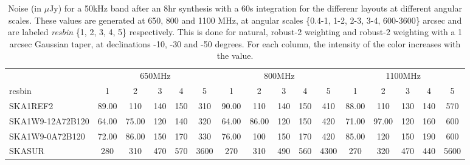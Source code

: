 \begin{table}[!htp]
{{\begin{tabular}{|lccccc||ccccc||ccccc|}
 \tabularnewline \cline{2-16} \multicolumn{1}{c}{ } & \multicolumn{5}{|c}{650MHz}  & \multicolumn{5}{c}{800MHz}  & \multicolumn{5}{c|}{1100MHz} \tabularnewline \cline{1-16} 
 resbin  &1 & 2 & 3 & 4 & 5 & 1 & 2 & 3 & 4 & 5 & 1 & 2 & 3 & 4 & 5 \tabularnewline \hline
SKA1REF2 & 89.00 \cellcolor{blue!22.86} & 110 \cellcolor{red!24.26} & 140 \cellcolor{green!20.40} & 150 \cellcolor{orange!18.98} & 310 \cellcolor{purple!18.00} & 90.00 \cellcolor{blue!23.30} & 110 \cellcolor{red!22.50} & 140 \cellcolor{green!20.27} & 150 \cellcolor{orange!18.00} & 410 \cellcolor{purple!18.00} & 88.00 \cellcolor{blue!21.59} & 110 \cellcolor{red!20.45} & 130 \cellcolor{green!19.20} & 140 \cellcolor{orange!18.00} & 570 \cellcolor{purple!18.00}\\ \hline 
SKA1W9-12A72B120 & 64.00 \cellcolor{blue!18.00} & 75.00 \cellcolor{red!18.00} & 120 \cellcolor{green!18.00} & 140 \cellcolor{orange!18.00} & 320 \cellcolor{purple!18.13} & 64.00 \cellcolor{blue!18.00} & 86.00 \cellcolor{red!18.00} & 120 \cellcolor{green!18.00} & 150 \cellcolor{orange!18.00} & 420 \cellcolor{purple!18.11} & 71.00 \cellcolor{blue!18.00} & 97.00 \cellcolor{red!18.00} & 120 \cellcolor{green!18.00} & 160 \cellcolor{orange!20.80} & 600 \cellcolor{purple!18.25}\\ \hline 
SKA1W9-0A72B120 & 72.00 \cellcolor{blue!19.56} & 86.00 \cellcolor{red!19.97} & 150 \cellcolor{green!21.60} & 170 \cellcolor{orange!20.93} & 330 \cellcolor{purple!18.26} & 76.00 \cellcolor{blue!20.45} & 100 \cellcolor{red!20.62} & 150 \cellcolor{green!21.41} & 170 \cellcolor{orange!20.05} & 420 \cellcolor{purple!18.11} & 85.00 \cellcolor{blue!20.95} & 120 \cellcolor{red!22.33} & 150 \cellcolor{green!21.60} & 190 \cellcolor{orange!25.00} & 600 \cellcolor{purple!18.25}\\ \hline 
SKASUR & 280 \cellcolor{blue!60.00} & 310 \cellcolor{red!60.00} & 470 \cellcolor{green!60.00} & 570 \cellcolor{orange!60.00} & 3600 \cellcolor{purple!60.00} & 270 \cellcolor{blue!60.00} & 310 \cellcolor{red!60.00} & 490 \cellcolor{green!60.00} & 560 \cellcolor{orange!60.00} & 4300 \cellcolor{purple!60.00} & 270 \cellcolor{blue!60.00} & 320 \cellcolor{red!60.00} & 470 \cellcolor{green!60.00} & 440 \cellcolor{orange!60.00} & 5600 \cellcolor{purple!60.00}\tabularnewline \hline 
\end{tabular}}\hfil 

\caption{Noise (in $\mu$Jy) for a 50kHz band after an 8hr synthesis with a 60s integration for the differenr layouts at different angular scales. These values are generated at 650, 800 and 1100 MHz, at angular scales \{0.4-1, 1-2, 2-3, 3-4, 600-3600\} arcsec and are labeled {\it resbin} \{1, 2, 3, 4, 5\} respectively. This is done for natural, robust-2 weighting and robust-2 weighting with a 1 arcsec Gaussian taper, at declinations -10, -30 and -50 degrees. For each column, the intensity of the color increases with the value.}\label{tab:noise50k}}
 \end{table}
